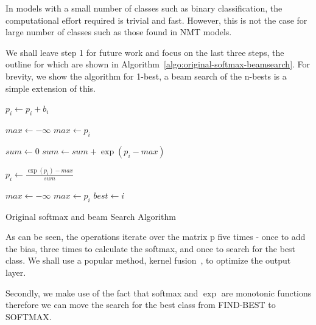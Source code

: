 \documentclass[11pt,a4paper]{article}
\begin{document}
In models with a small number of classes such as binary classification, the computational effort required is trivial and fast. However, this is not the case for large number of classes such as those found in NMT models.

We shall leave step 1 for future work and focus on the last three steps, the outline for which are shown in Algorithm~\ref{algo:original-softmax-beamsearch}. For brevity, we show the algorithm for 1-best, a beam search of the n-bests is a simple extension of this.

\begin{algorithm} 
\begin{algorithmic}

  \State $p_i \gets p_i + b_i$
\EndFor 
\EndProcedure

\State


\State $max \gets - \infty$ 
    \State $max \gets p_i$
  \EndIf
\EndFor

\State $sum \gets 0$ 
  \State $sum \gets sum + \exp(p_i - max)$
\EndFor

  \State $p_i \gets \frac{\exp(p_i) - max}{sum} $
\EndFor 

\EndProcedure

\State


\State $max \gets - \infty$ 
    \State $max \gets p_i$
    \State $best \gets i$
  \EndIf
\EndFor 

\EndProcedure

\end{algorithmic}
\caption{Original softmax and beam Search Algorithm}
\label{algo:original-softmax-beamsearch}
\end{algorithm}


As can be seen, the operations iterate over the matrix p five times - once to add the bias, three times to calculate the softmax, and once to search for the best class. We shall use a popular method, kernel fusion~\citep{Guevara2009EnablingTP}, to optimize the output layer.

Secondly, we make use of the fact that softmax and $\exp$ are monotonic functions therefore we can move the search for the best class from FIND-BEST to SOFTMAX.
\end{document}
